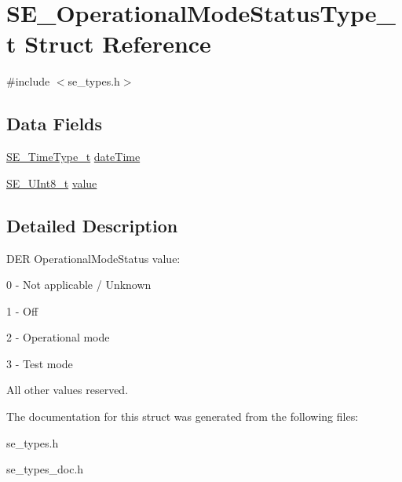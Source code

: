 \hypertarget{structSE__OperationalModeStatusType__t}{}\section{S\+E\+\_\+\+Operational\+Mode\+Status\+Type\+\_\+t Struct Reference}
\label{structSE__OperationalModeStatusType__t}


{\ttfamily \#include $<$se\+\_\+types.\+h$>$}

\subsection*{Data Fields}
\begin{DoxyCompactItemize}
\item 
\hyperlink{group__TimeType_ga6fba87a5b57829b4ff3f0e7638156682}{S\+E\+\_\+\+Time\+Type\+\_\+t} \hyperlink{group__OperationalModeStatusType_gab1ca6819ce73c80e1f1a370d20ff5247}{date\+Time}
\item 
\hyperlink{group__UInt8_gaf7c365a1acfe204e3a67c16ed44572f5}{S\+E\+\_\+\+U\+Int8\+\_\+t} \hyperlink{group__OperationalModeStatusType_gade4c320e2f3a121c6918c2446220e81a}{value}
\end{DoxyCompactItemize}


\subsection{Detailed Description}
D\+ER Operational\+Mode\+Status value\+:

0 -\/ Not applicable / Unknown

1 -\/ Off

2 -\/ Operational mode

3 -\/ Test mode

All other values reserved. 

The documentation for this struct was generated from the following files\+:\begin{DoxyCompactItemize}
\item 
se\+\_\+types.\+h\item 
se\+\_\+types\+\_\+doc.\+h\end{DoxyCompactItemize}
